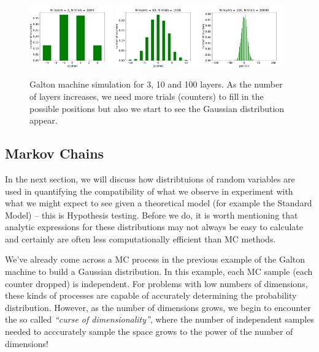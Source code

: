 \begin{figure}[hbt!]
    \centering
    \includegraphics[width=0.32\textwidth]{figures/Probability/layers3.pdf}
    \includegraphics[width=0.32\textwidth]{figures/Probability/layers10.pdf}
    \includegraphics[width=0.32\textwidth]{figures/Probability/layers100.pdf}
    \caption{Galton machine simulation for 3, 10 and 100 layers. As the number of layers increases, we need more trials (counters) to fill in the possible positions but also we start to see the Gaussian distribution appear.}
    \label{fig:simgalton}
\end{figure}

\subsection{Markov Chains}

In the next section, we will discuss how distribtuions of random 
variables are used in quantifying the compatibility of what we observe 
in experiment with what we might expect to see given a theoretical 
model (for example the Standard Model) -- this is Hypothesis testing. 
Before we do, it is worth mentioning that analytic expressions for 
these distributions may not always be easy to calculate and certainly 
are often less computationally efficient than MC methods. 

We've already come across a MC process in the previous 
example of the Galton machine to build a Gaussian distribution. In this 
example, each MC sample (each counter dropped) is independent. For problems 
with low numbers of dimensions, these kinds of processes are 
capable of accurately determining the probability distribution. However, 
as the number of dimensions grows, we begin to encounter the so called 
\emph{``curse of dimensionality''}, where the number of independent 
samples needed to acccurately sample the space grows to the power of 
the number of dimensions!

